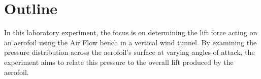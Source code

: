 \section{Outline}
\FloatBarrier %

In this laboratory experiment, the focus is on determining the lift force acting on an aerofoil using the Air Flow bench in a vertical wind tunnel. By examining the pressure distribution across the aerofoil's surface at varying angles of attack, the experiment aims to relate this pressure to the overall lift produced by the aerofoil.


